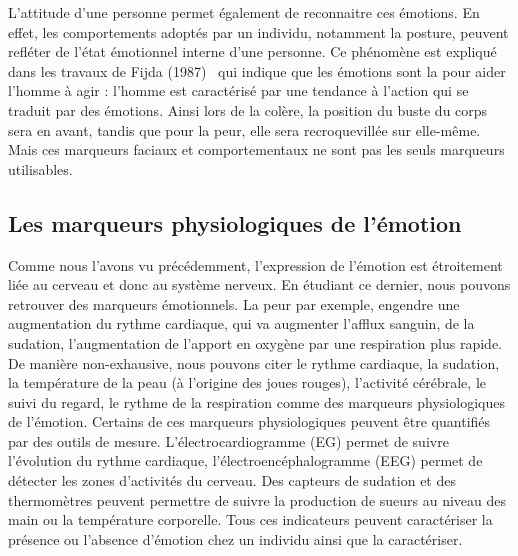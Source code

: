 L'attitude d'une personne permet également de reconnaitre ces émotions. En effet, les comportements adoptés par un individu, notamment la posture, peuvent refléter de l'état émotionnel interne d'une personne. Ce phénomène est expliqué dans les travaux de Fijda (1987)~\cite{Fijda1987} qui indique que les émotions sont la pour aider l'homme à agir : l'homme est caractérisé par une tendance à l'action qui se traduit par des émotions. Ainsi lors de la colère, la position du buste du corps sera en avant, tandis que pour la peur, elle sera recroquevillée sur elle-même. Mais ces marqueurs faciaux et comportementaux ne sont pas les seuls marqueurs utilisables.

\subsection{Les marqueurs physiologiques de l'émotion}
Comme nous l'avons vu précédemment, l'expression de l'émotion est étroitement liée au cerveau et donc au système nerveux. En étudiant ce dernier, nous pouvons retrouver des marqueurs émotionnels. La peur par exemple, engendre une augmentation du rythme cardiaque, qui va augmenter l'afflux sanguin, de la sudation, l'augmentation de l'apport en oxygène par une respiration plus rapide. De manière non-exhausive, nous pouvons citer le rythme cardiaque, la sudation, la température de la peau (à l'origine des joues rouges), l'activité cérébrale, le suivi du regard, le rythme de la respiration comme des marqueurs physiologiques de l'émotion. Certains de ces marqueurs physiologiques peuvent être quantifiés par des outils de mesure. L'électrocardiogramme (EG) permet de suivre l'évolution du rythme cardiaque, l'électroencéphalogramme (EEG) permet de détecter les zones d'activités du cerveau. Des capteurs de sudation et des thermomètres peuvent permettre de suivre la production de sueurs au niveau des main ou la température corporelle. Tous ces indicateurs peuvent caractériser la présence ou l'absence d'émotion chez un individu ainsi que la caractériser.
